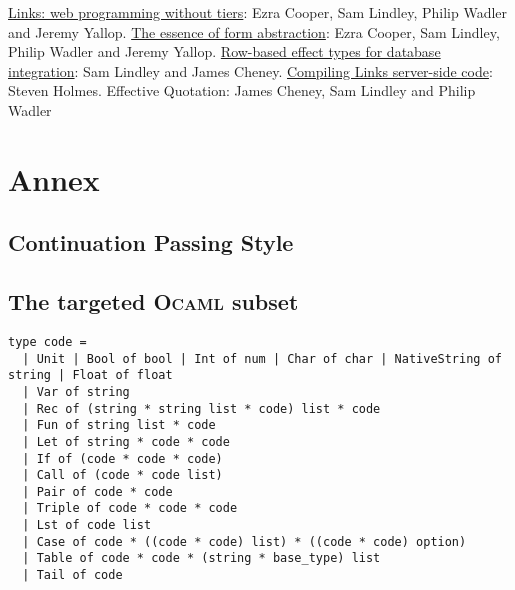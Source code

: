 \documentclass[11pt]{article}
\newcommand\mysc[1]{{\rmfamily\textsc{#1}}\xspace}
\newcommand\ocaml{\mysc{Ocaml}}
\begin{document}
\begin{thebibliography}{99}
 \href{http://groups.inf.ed.ac.uk/links/papers/links-fmco06.pdf}{Links: web programming without tiers}: Ezra Cooper, Sam Lindley, Philip Wadler and Jeremy Yallop.
 \href{http://groups.inf.ed.ac.uk/links/papers/formlets-essence.pdf}{The essence of form abstraction}: Ezra Cooper, Sam Lindley, Philip Wadler and Jeremy Yallop.
 \href{http://homepages.inf.ed.ac.uk/slindley/papers/corelinks.pdf}{Row-based effect types for database integration}: Sam Lindley and James Cheney.
 \href{http://groups.inf.ed.ac.uk/links/papers/undergrads/steven.pdf}{Compiling Links server-side code}: Steven Holmes.
 Effective Quotation: James Cheney, Sam Lindley and Philip Wadler
\end{thebibliography}

\section*{Annex}

\subsection*{Continuation Passing Style\label{cps}}

\subsection*{The targeted \ocaml subset\label{ocamlsubset}}
\begin{lstlisting}[language={[Objective]Caml}]
type code =
  | Unit | Bool of bool | Int of num | Char of char | NativeString of string | Float of float
  | Var of string
  | Rec of (string * string list * code) list * code
  | Fun of string list * code 
  | Let of string * code * code
  | If of (code * code * code)
  | Call of (code * code list)
  | Pair of code * code
  | Triple of code * code * code
  | Lst of code list
  | Case of code * ((code * code) list) * ((code * code) option)
  | Table of code * code * (string * base_type) list
  | Tail of code
\end{lstlisting}
\end{document}
